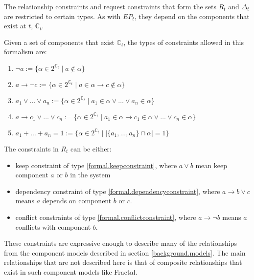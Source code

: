 The relationship constraints and request constraints that form the sets $R_t$ and $\Delta_t$ are restricted to certain types.
As with $EP_t$, they depend on the components that exist at $t$, $\mathbb{C}_t$.
\begin{defs}
Given a set of components that exist $\mathbb{C}_t$, the types of constraints allowed in this formalism are:
\begin{enumerate}
  \item $\neg a := \{\alpha \in 2^{\mathbb{C}_t} \mid a \not \in \alpha \}$ \label{formal.removeconstraint}
  \item $a \rightarrow \neg c := \{\alpha \in 2^{\mathbb{C}_t} \mid a \in \alpha \rightarrow c \not \in \alpha\}$ \label{formal.conflictconstraint}
  \item $a_1 \vee \ldots \vee a_n := \{\alpha \in 2^{\mathbb{C}_t} \mid a_1 \in \alpha \vee \ldots \vee a_n \in \alpha\}$ \label{formal.keepconstraint}
  \item $a \rightarrow c_1 \vee \ldots \vee c_n := \{\alpha \in 2^{\mathbb{C}_t} \mid a_1 \in \alpha \rightarrow  c_1 \in \alpha \vee \ldots \vee c_n \in \alpha\}$ \label{formal.dependencyconstraint}
  \item $a_1 + \ldots + a_n = 1 := \{\alpha \in 2^{\mathbb{C}_t} \mid |\{a_1,\ldots,a_n\} \cap \alpha| = 1\}$ \label{formal.upgradeconstraint}
\end{enumerate}
\end{defs} 

The constraints in $R_t$ can be either: 
\begin{itemize}
  \item keep constraint of type \ref{formal.keepconstraint}, where $a \vee b$ mean keep component $a$ or $b$ in the system
  \item dependency constraint of type \ref{formal.dependencyconstraint}, where $a \rightarrow b \vee c$ means $a$ depends on component $b$ or $c$.
  \item conflict constraints of type \ref{formal.conflictconstraint},  where $a \rightarrow \neg b$ means $a$ conflicts with component $b$.
\end{itemize}
These constraints are expressive enough to describe many of the relationships from the component models described in section \ref{background.models}.
The main relationships that are not described here is that of composite relationships that exist in such component models like Fractal.

